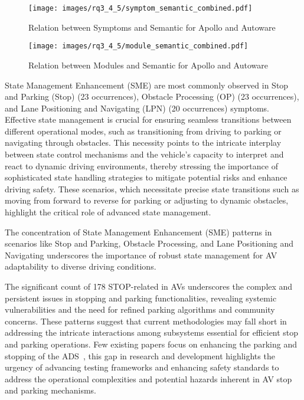 \begin{figure}[ht!]
    \centering
    \begin{minipage}{0.525\linewidth}
        \centering
        \texttt{[image: images/rq3\_4\_5/symptom\_semantic\_combined.pdf]}
        \vspace{-5ex}
        \caption{Relation between Symptoms and Semantic \BFPs for Apollo and Autoware}
        \label{fig:symptom_semantic_combined}
    \end{minipage}
    \hfill
    \begin{minipage}{0.465\linewidth}
        \centering
        \texttt{[image: images/rq3\_4\_5/module\_semantic\_combined.pdf]}
        \vspace{-5ex}
        \caption{Relation between Modules and Semantic \BFPs for Apollo and Autoware}
        \label{fig:module_semantic_combined}
    \end{minipage}
\end{figure}

State Management Enhancement (SME) \bfps are most commonly observed in Stop and Parking (Stop) (23 occurrences), Obstacle Processing (OP) (23 occurrences), and Lane Positioning and Navigating (LPN) (20 occurrences) symptoms. 
Effective state management is crucial for ensuring seamless transitions between different operational modes, such as transitioning from driving to parking or navigating through obstacles. This necessity points to the intricate interplay between state control mechanisms and the vehicle's capacity to interpret and react to dynamic driving environments, thereby stressing the importance of sophisticated state handling strategies to mitigate potential risks and enhance driving safety.
These scenarios, which necessitate precise state transitions such as moving from forward to reverse for parking or adjusting to dynamic obstacles, highlight the critical role of advanced state management.

\vspace{-1ex}
\begin{finding}
    \label{finding:rq4_sme}
    The concentration of State Management Enhancement (SME) patterns in scenarios like Stop and Parking, Obstacle Processing, and Lane Positioning and Navigating underscores the importance of robust state management for AV adaptability to diverse driving conditions. 
\end{finding}
\vspace{-1ex}


The significant count of 178 STOP-related \bfps in AVs underscores the complex and persistent issues in stopping and parking functionalities, revealing systemic vulnerabilities and the need for refined parking algorithms and community concerns. These patterns suggest that current methodologies may fall short in addressing the intricate interactions among subsystems essential for efficient stop and parking operations. Few existing papers focus on enhancing the parking and stopping of the ADS~\cite{IbischSANTSSK13,BanzhafNKZ17}, this gap in research and development highlights the urgency of advancing testing frameworks and enhancing safety standards to address the operational complexities and potential hazards inherent in AV stop and parking mechanisms.

